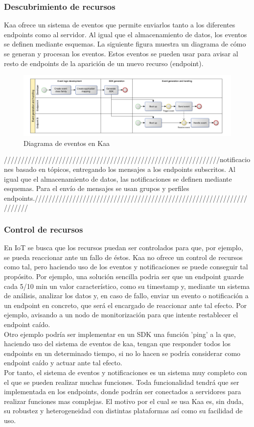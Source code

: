 \documentclass[12pt, twoside]{book}
\begin{document}
\subsubsection*{Descubrimiento de recursos}
Kaa ofrece un sistema de eventos que permite enviarlos tanto a los diferentes endpoints como al servidor. Al igual que el almacenamiento de datos, los eventos se definen mediante esquemas. La siguiente figura muestra un diagrama de cómo se generan y procesan los eventos. Estos eventos se pueden usar para avisar al resto de endpoints de la aparición de un nuevo recurso (endpoint).
\begin{figure}[H]
\centering
\includegraphics[scale=0.5]{images/events_schema}
\caption{Diagrama de eventos en Kaa}\label{L505}
\end{figure} 

 ///////////////////////////////////////////////////////////////notificaciones basado en tópicos, entregando los mensajes a los endpoints subscritos. Al igual que el almacenamiento de datos, las notificaciones se definen mediante esquemas. Para el envío de mensajes se usan grupos y perfiles endpoints./////////////////////////////////////////////////////////////////////

\subsubsection*{Control de recursos}
En IoT se busca que los recursos puedan ser controlados para que, por ejemplo, se pueda reaccionar ante un fallo de éstos. Kaa no ofrece un control de recursos como tal, pero haciendo uso de los eventos y notificaciones se puede conseguir tal propósito. Por ejemplo, una solución sencilla podria ser que un endpoint guarde cada 5/10 min un valor característico, como su timestamp y, mediante un sistema de análisis, analizar los datos y, en caso de fallo, enviar un evento o notificación a un endpoint en concreto, que será el encargado de reaccionar ante tal efecto. Por ejemplo, avisando a un nodo de monitorización para que intente restablecer el endpoint caído.\\
Otro ejemplo podría ser implementar en un SDK una función 'ping' a la que, haciendo uso del sistema de eventos de kaa, tengan que responder todos los endpoints en un determinado tiempo, si no lo hacen se podría considerar como endpoint caído y actuar ante tal efecto.\\
Por tanto, el sistema de eventos y notificaciones es un sistema muy completo con el que se pueden realizar muchas funciones. Toda funcionalidad tendrá que ser implementada en los endpoints, donde podrán ser conectados a servidores para realizar funciones mas complejas. El motivo por el cual se usa Kaa es, sin duda, su robustez y heterogeneidad con distintas plataformas así como su facilidad de uso. 
\end{document}
